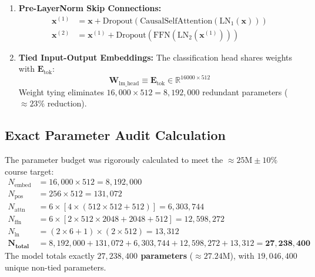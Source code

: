 \documentclass[11pt,a4paper]{article}
\begin{document}
\begin{enumerate}[noitemsep]
    \item \textbf{Pre-LayerNorm Skip Connections:}
    \begin{align}
        \mathbf{x}^{(1)} &= \mathbf{x} + \text{Dropout}\left(\text{CausalSelfAttention}(\text{LN}_1(\mathbf{x}))\right) \\
        \mathbf{x}^{(2)} &= \mathbf{x}^{(1)} + \text{Dropout}\left(\text{FFN}(\text{LN}_2(\mathbf{x}^{(1)}))\right)
    \end{align}
    \item \textbf{Tied Input-Output Embeddings:} The classification head shares weights with $\mathbf{E}_{\text{tok}}$:
    \begin{equation}
        \mathbf{W}_{\text{lm\_head}} \equiv \mathbf{E}_{\text{tok}} \in \mathbb{R}^{16000 \times 512}
    \end{equation}
    Weight tying eliminates $16,000 \times 512 = 8,192,000$ redundant parameters ($\approx 23\%$ reduction).
\end{enumerate}

\subsection{Exact Parameter Audit Calculation}
The parameter budget was rigorously calculated to meet the $\approx 25\text{M} \pm 10\%$ course target:
\begin{align}
    N_{\text{embed}} &= 16,000 \times 512 = 8,192,000 \\
    N_{\text{pos}} &= 256 \times 512 = 131,072 \\
    N_{\text{attn}} &= 6 \times \left[4 \times (512 \times 512 + 512)\right] = 6,303,744 \\
    N_{\text{ffn}} &= 6 \times \left[2 \times 512 \times 2048 + 2048 + 512\right] = 12,598,272 \\
    N_{\text{ln}} &= (2 \times 6 + 1) \times (2 \times 512) = 13,312 \\
    \mathbf{N_{\text{total}}} &= 8,192,000 + 131,072 + 6,303,744 + 12,598,272 + 13,312 = \mathbf{27,238,400}
\end{align}
The model totals exactly \textbf{$27,238,400$ parameters} ($\approx 27.24\text{M}$), with $19,046,400$ unique non-tied parameters.
\end{document}
